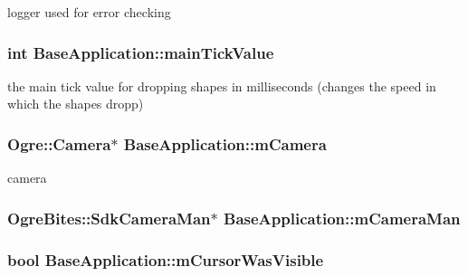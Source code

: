 logger used for error checking \hypertarget{class_base_application_adf36bb25e5d307e0b4433489c8227b46}{
\subsubsection[{main\-Tick\-Value}]{\setlength{\rightskip}{0pt plus 5cm}int Base\-Application\-::main\-Tick\-Value}}\label{class_base_application_adf36bb25e5d307e0b4433489c8227b46}
the main tick value for dropping shapes in milliseconds (changes the speed in which the shapes dropp) \hypertarget{class_base_application_a3829c6b12afe911e97e6b4524b33a38b}{
\subsubsection[{m\-Camera}]{\setlength{\rightskip}{0pt plus 5cm}Ogre\-::\-Camera$\ast$ Base\-Application\-::m\-Camera\hspace{0.3cm}{\ttfamily [protected]}}}\label{class_base_application_a3829c6b12afe911e97e6b4524b33a38b}
camera \hypertarget{class_base_application_a9ae38dea6316058549151fff66a91fcd}{
\subsubsection[{m\-Camera\-Man}]{\setlength{\rightskip}{0pt plus 5cm}Ogre\-Bites\-::\-Sdk\-Camera\-Man$\ast$ Base\-Application\-::m\-Camera\-Man\hspace{0.3cm}{\ttfamily [protected]}}}\label{class_base_application_a9ae38dea6316058549151fff66a91fcd}
\hypertarget{class_base_application_ac7e861799862cb645f1d78b170aef80d}{
\subsubsection[{m\-Cursor\-Was\-Visible}]{\setlength{\rightskip}{0pt plus 5cm}bool Base\-Application\-::m\-Cursor\-Was\-Visible\hspace{0.3cm}{\ttfamily [protected]}}}\label{class_base_application_ac7e861799862cb645f1d78b170aef80d}
